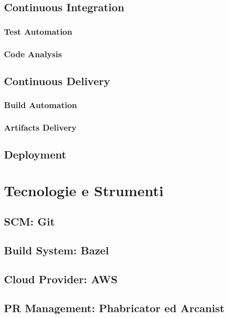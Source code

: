 \documentclass[a4paper,12pt]{report}
\begin{document}
	\subsection{Continuous Integration}
	
	\subsubsection{Test Automation}
	
	\subsubsection{Code Analysis}
	
	\subsection{Continuous Delivery}
	
	\subsubsection{Build Automation}
	
	\subsubsection{Artifacts Delivery}
	
	\subsection{Deployment}
	
	\section{Tecnologie e Strumenti}
	
	\subsection{SCM: Git}
	
	\subsection{Build System: Bazel}
	
	\subsection{Cloud Provider: AWS}
	
	\subsection{PR Management: Phabricator ed Arcanist}
	
\end{document}
